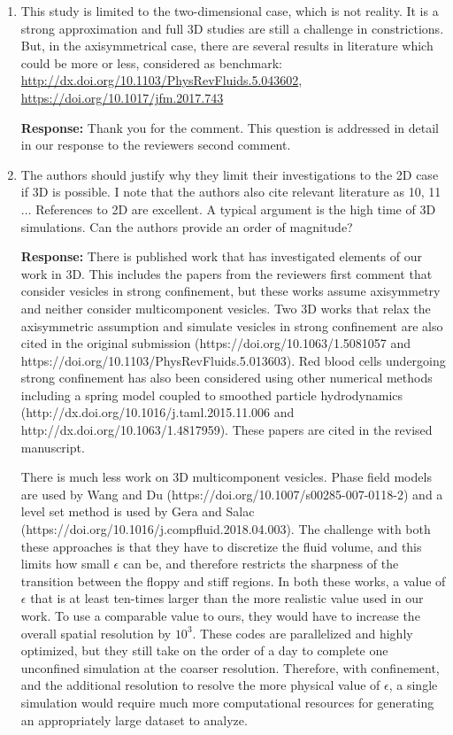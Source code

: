 \documentclass[11pt]{article}
\begin{document}
\begin{enumerate}
\item This study is limited to the two-dimensional case, which is not
  reality. It is a strong approximation and full 3D studies are still a
    challenge in constrictions. But, in the axisymmetrical case, there
    are several results in literature which could be more or less,
    considered as benchmark:
    \url{http://dx.doi.org/10.1103/PhysRevFluids.5.043602}, \\
    \url{https://doi.org/10.1017/jfm.2017.743}

\noindent
{\bf Response:} Thank you for the comment. This question is addressed in
detail in our response to the reviewers second comment.

\item The authors should justify why they limit their investigations to
  the 2D case if 3D is possible. I note that the authors also cite
    relevant literature as 10, 11 $\ldots$ References to 2D are
    excellent. A typical argument is the high time of 3D simulations.
    Can the authors provide an order of magnitude?

\noindent
{\bf Response:} There is published work that has investigated elements
of our work in  3D. This includes the papers from the reviewers first
comment that consider vesicles in strong confinement, but these works
assume axisymmetry and neither consider multicomponent vesicles. Two
3D works that relax the axisymmetric assumption and simulate vesicles in
strong confinement are also cited in the original submission
(https://doi.org/10.1063/1.5081057 and
https://doi.org/10.1103/PhysRevFluids.5.013603). Red blood cells
undergoing strong confinement has also been considered using other
numerical methods including a spring model coupled to smoothed particle
hydrodynamics (http://dx.doi.org/10.1016/j.taml.2015.11.006 and
http://dx.doi.org/10.1063/1.4817959). These papers are cited in the
revised manuscript.

There is much less work on 3D multicomponent vesicles. Phase field
models are used by Wang and Du
(https://doi.org/10.1007/s00285-007-0118-2) and a level set method is
used by Gera and Salac
(https://doi.org/10.1016/j.compfluid.2018.04.003). The challenge with
both these approaches is that they have to discretize the fluid volume,
and this limits how small $\epsilon$ can be, and therefore restricts
the sharpness of the transition between the floppy and stiff
regions. In both these works, a value of $\epsilon$ that is at least
ten-times larger than the more realistic value used in our work. To use
a comparable value to ours, they would have to increase the overall
spatial resolution by $10^3$. These codes are parallelized and highly
optimized, but they still take on the order of a day to complete one
unconfined simulation at the coarser resolution. Therefore, with
confinement, and the additional resolution to resolve the more physical
value of $\epsilon$, a single simulation would require much more
computational resources for generating an appropriately large dataset
to analyze.


\end{enumerate}
\end{document}
